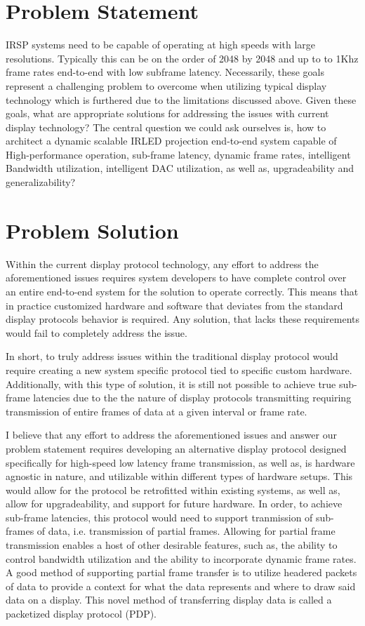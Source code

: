 \section{Problem Statement}
    IRSP systems need to be capable of operating at high speeds with large resolutions. Typically this can be on the order of 2048 by 2048 and up to to 1Khz frame rates end-to-end with low subframe latency. Necessarily, these goals represent a challenging problem to overcome when utilizing typical display technology which is furthered due to the limitations discussed above. Given these goals, what are appropriate solutions for addressing the issues with current display technology? The central question we could ask ourselves is, how to architect a dynamic scalable IRLED projection end-to-end system capable of High-performance operation, sub-frame latency, dynamic frame rates, intelligent Bandwidth utilization, intelligent DAC utilization, as well as, upgradeability and generalizability?

\section{Problem Solution}
    Within the current display protocol technology, any effort to address the aforementioned issues requires system developers to have complete control over an entire end-to-end system for the solution to operate correctly. This means that in practice customized hardware and software that deviates from the standard display protocols behavior is required. Any solution, that lacks these requirements would fail to completely address the issue.

    In short, to truly address issues within the traditional display protocol would require creating a new system specific protocol tied to specific custom hardware. Additionally, with this type of solution, it is still not possible to achieve true sub-frame latencies due to the the nature of display protocols transmitting requiring transmission of entire frames of data at a given interval or frame rate.

    I believe that any effort to address the aforementioned issues and answer our problem statement requires developing an alternative display protocol designed specifically for high-speed low latency frame transmission, as well as, is hardware agnostic in nature, and utilizable within different types of hardware setups. This would allow for the protocol be retrofitted within existing systems, as well as, allow for upgradeability, and support for future hardware. In order, to achieve sub-frame latencies, this protocol would need to support tranmission of sub-frames of data, i.e. transmission of partial frames. Allowing for partial frame transmission enables a host of other desirable features, such as, the ability to control bandwidth utilization and the ability to incorporate dynamic frame rates. A good method of supporting partial frame transfer is to utilize headered packets of data to provide a context for what the data represents and where to draw said data on a display. This novel method of transferring display data is called a packetized display protocol (PDP).


